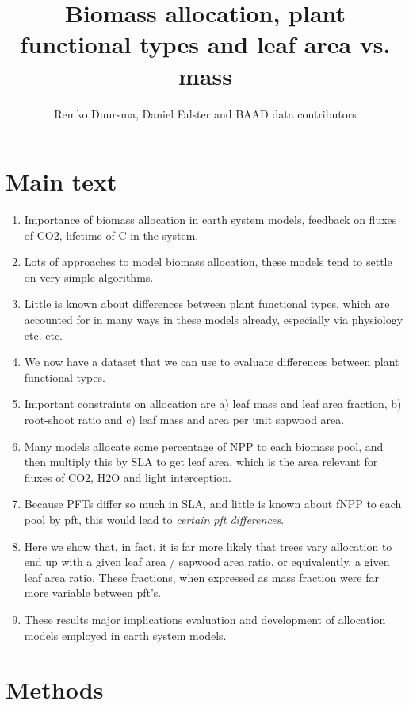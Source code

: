 \documentclass[a4paper]{article}
\begin{document}
\title{Biomass allocation, plant functional types and leaf area vs. mass}

\author{Remko Duursma, Daniel Falster and BAAD data contributors}

\maketitle



\section{Main text}

\begin{enumerate}
  \item Importance of biomass allocation in earth system models, feedback on fluxes of CO2, lifetime of C in the system.
  \item Lots of approaches to model biomass allocation, these models tend to settle on very simple algorithms.
  \item Little is known about differences between plant functional types, which are accounted for in many ways in these models already, especially via physiology etc. etc. 
  \item We now have a dataset that we can use to evaluate differences between plant functional types.
  \item Important constraints on allocation are a) leaf mass and leaf area fraction, b) root-shoot ratio and c) leaf mass and area per unit sapwood area.
  \item Many models allocate some percentage of NPP to each biomass pool, and then multiply this by SLA to get leaf area, which is the area relevant for fluxes of CO2, H2O and light interception.
  \item Because PFTs differ so much in SLA, and little is known about fNPP to each pool by pft, this would lead to \emph{certain pft differences}.
  \item Here we show that, in fact, it is far more likely that trees vary allocation to end up with a given leaf area / sapwood area ratio, or equivalently, a given leaf area ratio. These fractions, when expressed as mass fraction were far more variable between pft's.
  \item These results major implications evaluation and development of allocation models employed in earth system models.
\end{enumerate}



\section{Methods}
\end{document}
